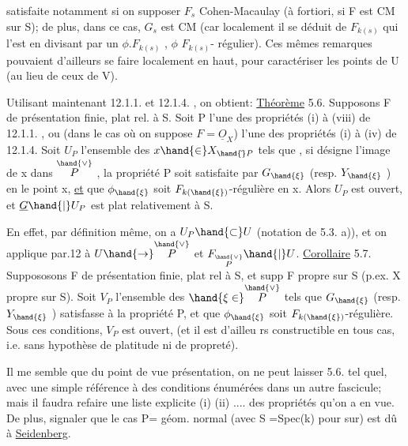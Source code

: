 
satisfaite notamment si on supposer $F_s$ Cohen-Macaulay (à fortiori, si
F est CM sur S); de plus, dans ce cas, $G_s$ est CM (car localement il se
déduit de $F_{k(s)}$ qui l'est en divisant par un $\phi . F_{k(s)}$ ,   $\phi$  $F_{k(s)}$-%
régulier). Ces mêmes remarques pouvaient  d'ailleurs se faire localement
en haut, pour caractériser les points de U (au lieu de ceux de V).

Utilisant maintenant 12.1.1. et 12.1.4. , on obtient:
\uline{Théorème} 5.6. Supposons F de présentation finie, plat rel. à S. Soit
P l'une des propriétés 
 (i) à (viii) de 12.1.1. ,
ou  (dans le cas où on suppose $F=\underline{O}_X$) l'une des
 propriétés (i) à (iv)\hand{/} de 12.1.4. Soit
 $U_P$  l'ensemble des $x \hand{\in} X_{\hand{\check{}}P}$ tels que , si \hand{$\xi$}
 désigne l'image de x dans $\overset{\hand{\vee}}{P}$ , la propriété P soit satisfaite
par $G_{\hand{\xi}}$ (resp.  $Y_{\hand{\xi}}$ ) en le point x, \uline{et} que $\phi_{\hand{\xi}}$ soit $F_{k(\hand{\xi})}$-régulière en x.
Alors $U_P$ est ouvert, et $\underline{G}\hand{|}U_P$ est plat relativement à S.

En effet, par définition même, on a $U_P \hand{\subset} U$ (notation de 5.3. a)),
et on applique par.12 à $U \hand{\to} \overset{\hand{\vee}}{P}$ et $F_{\overset{\hand{\vee}}{P}}\hand{|}U$.
\uline{Corollaire} 5.7. Suppososons F de présentation finie, plat rel à S,
et supp F propre sur S (p.ex. X propre sur S). Soit $V_P$ l'ensemble des
$\hand{\xi\in}\overset{\hand{\vee}}{P}$ tels que $G_{\hand{\xi}}$ (resp. $Y_{\hand{\xi}}$ ) satisfasse à la propriété P, et que $\phi_{\hand{\xi}}$ soit
$F_{k(\hand{\xi})}$-régulière. Sous ces conditions, $V_P$ est ouvert, (et il est d'ailleu
rs constructible en tous cas, i.e. sans hypothèse de platitude ni de
propreté).

Il me semble que du point de vue présentation, on ne peut laisser
5.6. tel quel, avec une simple référence à des conditions énumérées dans
un autre fascicule; mais il faudra refaire une liste explicite (i) (ii)
.... des propriétés qu'on a en vue. De plus, signaler  que le cas P= géom.
normal (avec S =Spec(k) pour sur) est dû à \uline{Seidenberg}.


